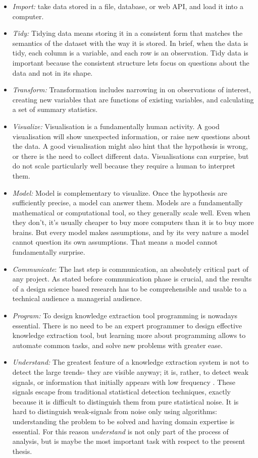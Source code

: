 \documentclass[]{book}
\theoremstyle{definition}
\theoremstyle{definition}
\theoremstyle{definition}
\theoremstyle{remark}
\begin{document}
\begin{itemize}
\item
  \emph{Import:} take data stored in a file, database, or web API, and
  load it into a computer.
\item
  \emph{Tidy:} Tidying data means storing it in a consistent form that
  matches the semantics of the dataset with the way it is stored. In
  brief, when the data is tidy, each column is a variable, and each row
  is an observation. Tidy data is important because the consistent
  structure lets focus on questions about the data and not in its shape.
\item
  \emph{Transform:} Transformation includes narrowing in on observations
  of interest, creating new variables that are functions of existing
  variables, and calculating a set of summary statistics.
\item
  \emph{Visualize:} Visualisation is a fundamentally human activity. A
  good visualisation will show unexpected information, or raise new
  questions about the data. A good visualisation might also hint that
  the hypothesis is wrong, or there is the need to collect different
  data. Visualisations can surprise, but do not scale particularly well
  because they require a human to interpret them.
\item
  \emph{Model:} Model is complementary to visualize. Once the hypothesis
  are sufficiently precise, a model can answer them. Models are a
  fundamentally mathematical or computational tool, so they generally
  scale well. Even when they don't, it's usually cheaper to buy more
  computers than it is to buy more brains. But every model makes
  assumptions, and by its very nature a model cannot question its own
  assumptions. That means a model cannot fundamentally surprise.
\item
  \emph{Communicate}: The last step is communication, an absolutely
  critical part of any project. As stated before communication phase is
  crucial, and the results of a design science based research has to be
  comprehensible and usable to a technical audience a managerial
  audience.
\item
  \emph{Program:} To design knowledge extraction tool programming is
  nowadays essential. There is no need to be an expert programmer to
  design effective knowledge extraction tool, but learning more about
  programming allows to automate common tasks, and solve new problems
  with greater ease.
\item
  \emph{Understand:} The greatest feature of a knowledge extraction
  system is not to detect the large trends- they are visible anyway; it
  is, rather, to detect weak signals, or information that initially
  appears with low frequency \citep{apreda2016functional}. These signals
  escape from traditional statistical detection techniques, exactly
  because it is difficult to distinguish them from pure statistical
  noise. It is hard to distinguish weak-signals from noise only using
  algorithms: understanding the problem to be solved and having domain
  expertise is essential. For this reason \emph{understand} is not only
  part of the process of analysis, but is maybe the most important task
  with respect to the present thesis.
\end{itemize}
\end{document}
